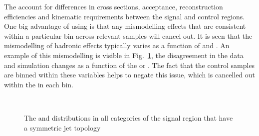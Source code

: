 The \TFs account for differences in cross sections, acceptance,
reconstruction efficiencies and kinematic requirements between the
signal and control regions. One big advantage of using \TFs is that
any mismodelling effects that are consistent within a particular bin
across relevant \MC samples will cancel out. It is seen that the
mismodelling of hadronic effects typically varies as a function of \HT
and \nj. An example of this mismodelling is visible in
Fig.~\ref{fig:distribution_signal}, the disagreement in the data and
simulation changes as a function of the \HT or \nj. The fact
that the control samples are binned within these variables helps to
negate this issue, which is cancelled out within the \TF in each bin.

\begin{figure}
    \begin{center}
         ~~
         \\
        \caption{The \HT and \nj distributions in all categories of
        the signal region that have a symmetric jet topology}
        \label{fig:distribution_signal}
    \end{center}
\end{figure}

